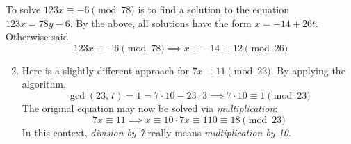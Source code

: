 \begin{examples}{}{}
	\exstart To solve $123x\equiv -6\pmod{78}$ is to find a solution to the equation $123x=78y-6$. By the above, all solutions have the form $x=-14+26t$. Otherwise said
	\[123x\equiv -6\pmod{78} \implies x\equiv -14\equiv 12\pmod{26}\]
	\begin{enumerate}\setcounter{enumi}{1}
	  \item Here is a slightly different approach for $7x\equiv 11\pmod{23}$. By applying the algorithm,
		\[
			\gcd(23,7)=1=7\cdot 10-23\cdot 3 \implies 7\cdot 10\equiv 1\pmod{23}
		\]
		The original equation may now be solved via \emph{multiplication}:
		\[
			7x\equiv 11 \implies x\equiv 10\cdot 7x\equiv 110\equiv 18\pmod{23}
		\]
		In this context, \emph{division by 7} really means \emph{multiplication\footnotemark{} by 10}.
	\end{enumerate}
\end{examples}


% 

